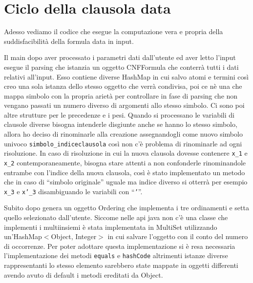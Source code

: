 \documentclass[a4paper,11pt]{article} %
\newcommand{\sintassi}{\texttt}
\newcommand{\classe}{\textsf}
\newcommand{\metodo}{\texttt}
\begin{document}
\section{Ciclo della clausola data}\label{sec: ciclo}
Adesso vediamo il codice che esegue la computazione vera e propria della
suddisfacibilità della formula data in input.

Il main dopo aver processato i parametri dati dall'utente ed aver letto l'input
esegue il parsing che istanzia un oggetto \classe{CNFFormula} che
conterrà tutti i dati relativi all'input. Esso contiene diverse \classe{HashMap} 
in cui salvo atomi e termini così creo una sola istanza dello stesso oggetto
che verrà condivisa, 
poi ce nè una
che mappa simbolo con la propria arietà per controllare in fase di parsing
che non vengano passati un numero diverso di argomenti allo stesso simbolo. 
Ci sono poi altre
strutture per le precedenze e i pesi. 
Quando si processano le variabili di clausole diverse bisogna intenderle disgiunte
anche se hanno lo stesso simbolo, allora ho deciso di rinominarle alla creazione 
assegnandogli come nuovo simbolo univoco 
\sintassi{simbolo\_indiceclausola} così non c'è problema di rinominarle ad ogni
risoluzione. In caso di risoluzione in cui la nuova clausola dovesse contenere
\sintassi{x\_1} e \sintassi{x\_2} contemporaneamente, bisogna stare attenti a non confonderle
rinominandole entrambe con l'indice della nuova clausola, così è stato implementato
un metodo che in caso di ``simbolo originale'' uguale ma indice diverso
si otterrà per esempio \sintassi{x\_3} e \sintassi{x'\_3} disambiguando le variabili
con ``\sintassi{'}''.

Subito dopo genera un oggetto \classe{Ordering} che implementa i tre ordinamenti
e setta quello selezionato dall'utente. Siccome nelle api java non c'è una classe che implementi
i multiinsiemi è stata implementata in \classe{MultiSet} utilizzando 
un'\classe{HashMap$<$Object, Integer$>$} in cui salvare l'oggetto con il conto del
numero di occorrenze. Per poter adottare questa implementazione si è resa 
necessaria l'implementazione dei metodi \metodo{equals} e \metodo{hashCode}
altrimenti istanze diverse rappresentanti lo stesso elemento sarebbero state 
mappate in oggetti differenti avendo avuto di default i metodi ereditati da \classe{Object}. 
\end{document}
